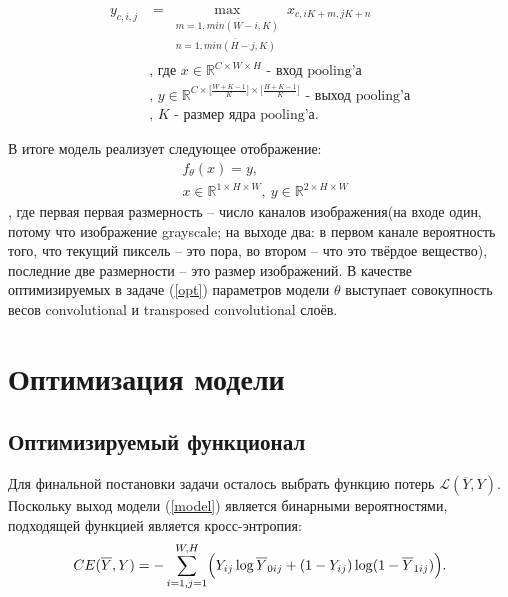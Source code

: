 \documentclass[14pt, a4paper, oneside, bold]{extarticle}
\begin{document}
\begin{equation} \label{pooling}
\begin{aligned}
	y_{c, i, j} & = \max \limits_{
		\substack{
			m=\overline{1, min(W - i, K)}
			\\ n=\overline{1, min(H - j, K)}}}
		x_{c, i K + m, j K + n} \\
	& \text{, где $x \in \mathbb{R}^{C \times W \times H}$ 
		- вход pooling'а} \\
	& \text{, $y \in \mathbb{R}
		^{C 
		  \times \bigl[ \frac{W + K - 1}{K} \bigr] 
		  \times \bigl[ \frac{H + K - 1}{K} \bigr] }$ 
		- выход pooling'а} \\
	& \text{, $K$ - размер ядра pooling'а}.
\end{aligned}
\end{equation}

В итоге модель реализует следующее отображение: 
\begin{equation} \label{model}
\begin{aligned}
	& f_{\theta}(x) = y, \\
	& x \in \mathbb{R}^{1 \times H \times W}
		,\ y \in 
		\mathbb{R}^{2 \times H \times W}
\end{aligned}
\end{equation}
, где первая первая размерность -- число каналов изображения(на входе один, потому что изображение grayscale; на выходе два: в первом канале вероятность того, что текущий пиксель -- это пора, во втором -- что это твёрдое вещество), последние две размерности -- это размер изображений. В качестве оптимизируемых в задаче (\ref{opt}) параметров модели $\theta$ выступает совокупность весов convolutional и transposed convolutional слоёв.

\clearpage

\newpage


\section{Оптимизация модели} \label{seg_optimization}

\subsection{Оптимизируемый функционал}

Для финальной постановки задачи осталось выбрать функцию потерь 
$\mathcal{L}(\overline{Y}, Y)$. Поскольку выход модели (\ref{model})
является бинарными вероятностями, подходящей функцией является кросс-энтропия:
\begin{equation} \label{cross-entropy}
	CE(\overline{Y}, Y) = -\sum \limits_{i=1, j=1}^{W, H} \Bigl(
		Y_{ij} \log \overline{Y}_{0ij} 
		+ (1 - Y_{ij}) \log (1 - \overline{Y}_{1ij}) \Bigr).
\end{equation}
\end{document}
